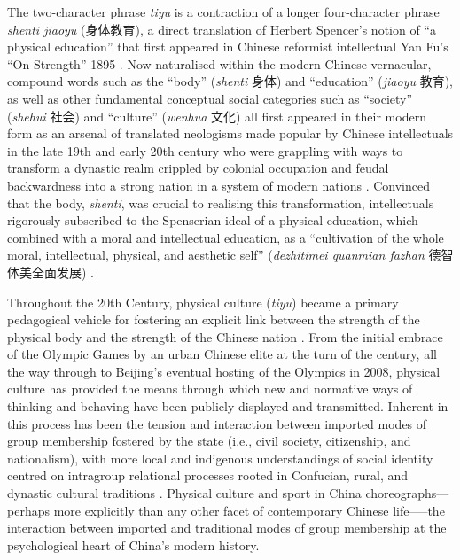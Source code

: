   The two-character phrase \textit{tiyu} is a contraction of a longer four-character phrase \textit{shenti jiaoyu} (身体教育), a direct translation of Herbert Spencer’s notion of  ``a physical education'' that first appeared in Chinese reformist intellectual Yan Fu’s ``On Strength'' 1895 \citep[9-10]{Morris2004}.  Now naturalised within the modern Chinese vernacular, compound words such as the ``body'' (\textit{shenti} 身体) and ``education'' (\textit{jiaoyu} 教育), as well as other fundamental conceptual social categories such as ``society'' (\textit{shehui} 社会) and ``culture'' (\textit{wenhua} 文化) all first appeared in their modern form as an arsenal of translated neologisms made popular by Chinese intellectuals in the late 19th and early 20th century who were grappling with ways to transform a dynastic realm crippled by colonial occupation and feudal backwardness into a strong nation in a system of modern nations \citep{Pusey1983;Schwartz1964;Liu 1995;Huters2005}.   Convinced that the body, \textit{shenti}, was crucial to realising this transformation, intellectuals rigorously subscribed to the Spenserian ideal of a physical education, which combined with a moral and intellectual education, as a ``cultivation of the whole moral, intellectual, physical, and aesthetic self'' (\textit{dezhitimei quanmian fazhan} 德智体美全面发展) \citep[10]{Morris2004}.

  Throughout the 20th Century, physical culture (\textit{tiyu}) became a primary pedagogical vehicle for fostering an explicit link between the strength of the physical body and the strength of the Chinese nation \cites[32]{Morris2004}[49]{Brownell1995}.  From the initial embrace of the Olympic Games by an urban Chinese elite at the turn of the century, all the way through to Beijing's eventual hosting of the Olympics in 2008, physical culture has provided the means through which new and normative ways of thinking and behaving have been publicly displayed and transmitted.  Inherent in this process has been the tension and interaction between imported modes of group membership fostered by the state (i.e., civil society, citizenship, and nationalism), with more local and indigenous understandings of social identity centred on intragroup relational processes rooted in Confucian, rural, and dynastic cultural traditions \citep{Fei1992}.  Physical culture and sport in China choreographs---perhaps more explicitly than any other facet of contemporary Chinese life—--the interaction between imported and traditional modes of group membership at the psychological heart of China's modern history.


